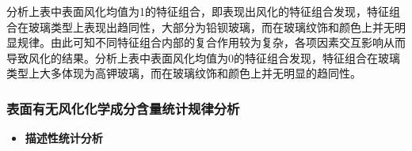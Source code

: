 \documentclass[withoutpreface,bwprint]{cumcmthesis} %
\begin{document}
分析上表中表面风化均值为1的特征组合，即表现出风化的特征组合发现，特征组合在玻璃类型上表现出趋同性，大部分为铅钡玻璃，而在玻璃纹饰和颜色上并无明显规律。由此可知不同特征组合内部的复合作用较为复杂，各项因素交互影响从而导致风化的结果。分析上表中表面风化均值为0的特征组合发现，特征组合在玻璃类型上大多体现为高钾玻璃，而在玻璃纹饰和颜色上并无明显的趋同性。

\subsubsection{表面有无风化化学成分含量统计规律分析}

\begin{itemize}
	\item \textbf{描述性统计分析}
\end{itemize}
\end{document}
